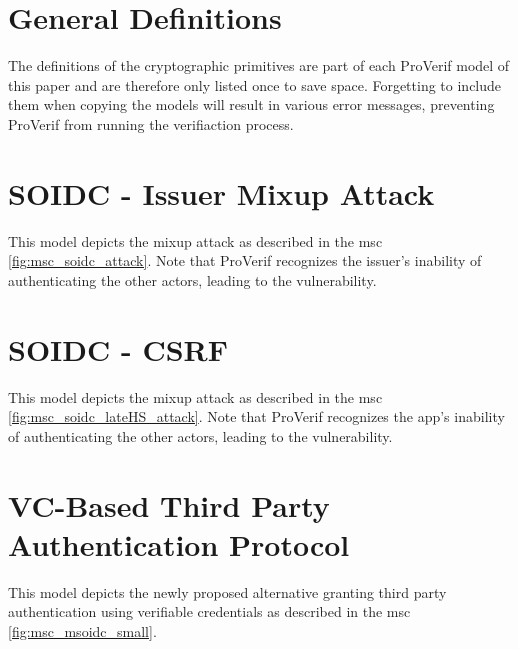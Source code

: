 \documentclass[11pt,twoside,a4paper,openright]{book}
\begin{document}
\section{General Definitions}

The definitions of the cryptographic primitives are part of each ProVerif model of this paper and are therefore only listed once to save space. Forgetting to include them when copying the models will result in various error messages, preventing ProVerif from running the verifiaction process.




\section{SOIDC - Issuer Mixup Attack}
\label{appendix_issuer_mixup}

This model depicts the mixup attack as described in the msc \ref{fig:msc_soidc_attack}. Note that ProVerif recognizes the issuer's inability of authenticating the other actors, leading to the vulnerability.




\section{SOIDC - CSRF}
\label{appendix_csrf}

This model depicts the mixup attack as described in the msc \ref{fig:msc_soidc_lateHS_attack}. Note that ProVerif recognizes the app's inability of authenticating the other actors, leading to the vulnerability.




\section{VC-Based Third Party Authentication Protocol}
\label{appendix_msoidc}

This model depicts the newly proposed alternative granting third party authentication using verifiable credentials as described in the msc \ref{fig:msc_msoidc_small}.



\end{document}
